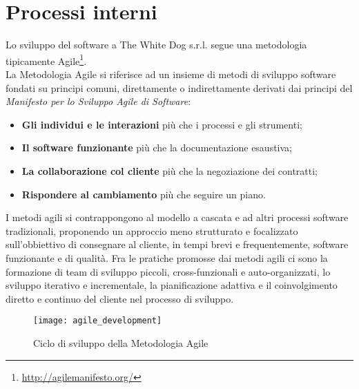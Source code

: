 \section{Processi interni}

Lo sviluppo del software a The White Dog s.r.l. segue una metodologia tipicamente Agile\footnote[3]{\url{http://agilemanifesto.org/}}. \\ 
La Metodologia Agile si riferisce ad un insieme di metodi di sviluppo software fondati su principi comuni, direttamente o indirettamente derivati dai principi del \textit{Manifesto per lo Sviluppo Agile di Software}: 

\begin{itemize}
	\item \textbf{Gli individui e le interazioni} più che i processi e gli strumenti;
	\item \textbf{Il software funzionante} più che la documentazione esaustiva;
	\item \textbf{La collaborazione col cliente} più che la negoziazione dei contratti;
	\item \textbf{Rispondere al cambiamento} più che seguire un piano.
\end{itemize}

I metodi agili si contrappongono al modello a cascata e ad altri processi software tradizionali, proponendo un approccio meno strutturato e focalizzato sull'obbiettivo di consegnare al cliente, in tempi brevi e frequentemente, software funzionante e di qualità. Fra le pratiche promosse dai metodi agili ci sono la formazione di team di sviluppo piccoli, cross-funzionali e auto-organizzati, lo sviluppo iterativo e incrementale, la pianificazione adattiva e il coinvolgimento diretto e continuo del cliente nel processo di sviluppo. 

\label{Metodologia Agile}
\begin{figure}[ht]
	\begin{center}
		\texttt{[image: agile\_development]}
		\caption{Ciclo di sviluppo della Metodologia Agile}
	\end{center}
\end{figure}
\FloatBarrier

